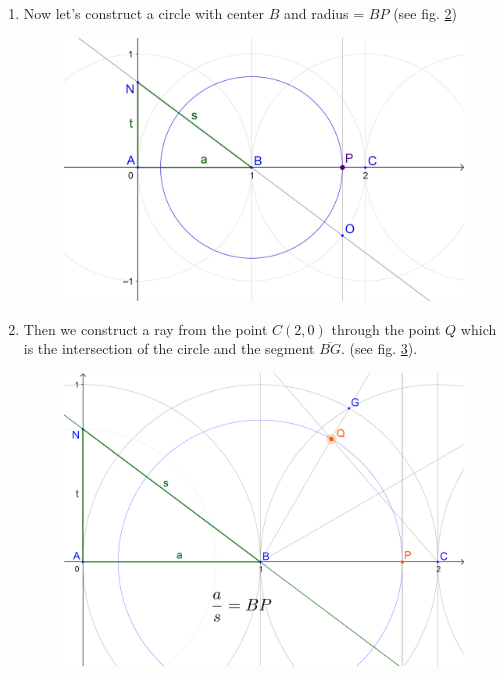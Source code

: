 \documentclass[12pt, letterpaper, oneside]{report}
\begin{document}
\begin{enumerate}
\begin{figure}[h]
	\label{fig:2_second}
\end{figure}
\\
	\item Now let's construct a circle with center $B$ and radius = $BP$ (see fig. \ref{fig:anbop})\\ 
\begin{figure}[h]
	\centerline{\includegraphics[scale=0.15]{img/anbop.jpg}}
	\caption{}
	\label{fig:anbop}
\end{figure}
\newpage
	\item Then we construct a ray from the point $C(2,0)$ through the point $Q$ which is the intersection of the circle and the segment $\overline{BG}$. (see fig. \ref{fig:anbopq}).
\begin{figure}[h]
	\centerline{\includegraphics[scale=0.15]{img/anbopQ.png}}
	\caption{}
	\label{fig:anbopq}

\end{figure}
\end{enumerate}
\end{document}
